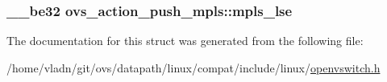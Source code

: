 \subsubsection[{mpls\+\_\+lse}]{\setlength{\rightskip}{0pt plus 5cm}\+\_\+\+\_\+be32 ovs\+\_\+action\+\_\+push\+\_\+mpls\+::mpls\+\_\+lse}\label{structovs__action__push__mpls_a58c09de1a14973c13197f7748beb3803}


The documentation for this struct was generated from the following file\+:\begin{DoxyCompactItemize}
\item 
/home/vladn/git/ovs/datapath/linux/compat/include/linux/\hyperlink{openvswitch_8h}{openvswitch.\+h}\end{DoxyCompactItemize}
